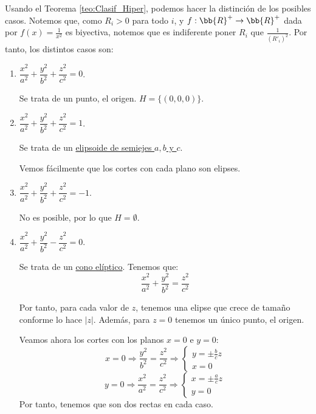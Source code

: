 Usando el Teorema \ref{teo:Clasif_Hiper}, podemos hacer la distinción de los posibles casos. Notemos que, como $R_i>0$ para todo $i$, y $f:\bb{R}^+\to \bb{R}^+$ dada por $f(x)=\frac{1}{x^2}$ es biyectiva, notemos que es indiferente poner $R_i$ que $\frac{1}{(R'_i)^2}$. Por tanto, los distintos casos son:
\begin{enumerate}
    \item $\dfrac{x^2}{a^2} + \dfrac{y^2}{b^2} + \dfrac{z^2}{c^2} = 0$.

    Se trata de un punto, el origen. $H=\{(0,0,0)\}$.
    
    \item $\dfrac{x^2}{a^2} + \dfrac{y^2}{b^2} + \dfrac{z^2}{c^2} = 1$.

    Se trata de un \ul{elipsoide de semiejes $a,b$ y $c$}.

    Vemos fácilmente que los cortes con cada plano son elipses.
    
    \item $\dfrac{x^2}{a^2} + \dfrac{y^2}{b^2} + \dfrac{z^2}{c^2} = -1$.

    No es posible, por lo que $H=\emptyset$.
    
    \item $\dfrac{x^2}{a^2} + \dfrac{y^2}{b^2} - \dfrac{z^2}{c^2} = 0$.

    Se trata de un \ul{cono elíptico}. Tenemos que:
    \begin{equation*}
        \dfrac{x^2}{a^2} + \dfrac{y^2}{b^2} = \dfrac{z^2}{c^2}
    \end{equation*}

    Por tanto, para cada valor de $z$, tenemos una elipse que crece de tamaño conforme lo hace $|z|$. Además, para $z=0$ tenemos un único punto, el origen.

    Veamos ahora los cortes con los planos $x=0$ e $y=0$:
    \begin{equation*}
        x = 0 \Longrightarrow \dfrac{y^2}{b^2} = \dfrac{z^2}{c^2} \Longrightarrow \left\{\begin{array}{c}
            y = \pm \frac{b}{c}z\\
            x=0
        \end{array}\right.
    \end{equation*}
    \begin{equation*}
        y = 0 \Longrightarrow \dfrac{x^2}{a^2} = \dfrac{z^2}{c^2} \Longrightarrow \left\{\begin{array}{c}
            x = \pm \frac{a}{c}z\\
            y=0
        \end{array}\right.
    \end{equation*}
    Por tanto, tenemos que son dos rectas en cada caso.
    

\end{enumerate}
